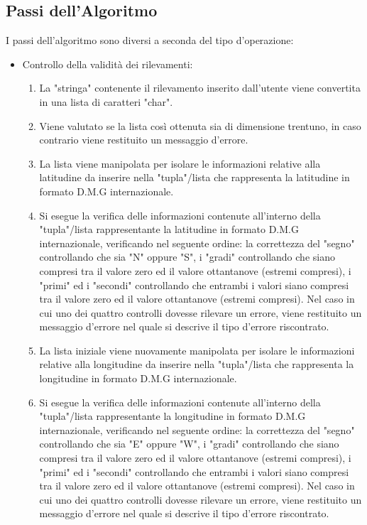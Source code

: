 \documentclass{article}
\begin{document}
\subsection{Passi dell'Algoritmo}
I passi dell'algoritmo sono diversi a seconda del tipo d'operazione:
\begin{itemize}
	
	\item Controllo della validità dei rilevamenti:
	\begin{enumerate}
		\item La "stringa" contenente il rilevamento inserito dall'utente viene convertita in una lista di caratteri "char".
		\item Viene valutato se la lista così ottenuta sia di dimensione trentuno, in caso contrario viene restituito un messaggio d'errore.
		\item La lista viene manipolata per isolare le informazioni relative alla latitudine da inserire nella "tupla"/lista che rappresenta la latitudine in formato D.M.G internazionale.
		\item Si esegue la verifica delle informazioni contenute all'interno della "tupla"/lista rappresentante la latitudine in formato D.M.G internazionale, verificando nel seguente ordine:  la correttezza del "segno" controllando che sia "N" oppure "S", i "gradi" controllando che siano compresi tra il valore zero ed il valore ottantanove (estremi compresi), i "primi" ed i "secondi" controllando che entrambi i valori siano compresi tra il valore zero ed il valore ottantanove (estremi compresi). Nel caso in cui uno dei quattro controlli dovesse rilevare un errore, viene restituito un messaggio d'errore nel quale si descrive il tipo d'errore riscontrato.
		\item La lista iniziale viene nuovamente manipolata per isolare le informazioni relative alla longitudine da inserire nella "tupla"/lista che rappresenta la longitudine in formato D.M.G internazionale.
		\item Si esegue la verifica delle informazioni contenute all'interno della "tupla"/lista rappresentante la longitudine in formato D.M.G internazionale, verificando nel seguente ordine:  la correttezza del "segno" controllando che sia "E" oppure "W", i "gradi" controllando che siano compresi tra il valore zero ed il valore ottantanove (estremi compresi), i "primi" ed i "secondi" controllando che entrambi i valori siano compresi tra il valore zero ed il valore ottantanove (estremi compresi). Nel caso in cui uno dei quattro controlli dovesse rilevare un errore, viene restituito un messaggio d'errore nel quale si descrive il tipo d'errore riscontrato.
	\end{enumerate}


\end{itemize}
\end{document}
